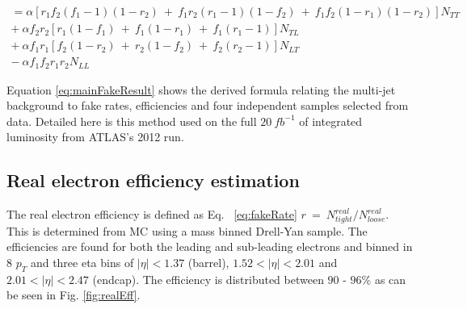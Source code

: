 \begin{equation} \label{eq:mainFakeResult}
\begin{aligned}
   =\alpha[r_{1}f_{2}(f_{1}-1)(1-r_{2})~+~f_{1}r_{2}(r_{1}-1)(1-f_{2})~+~f_{1}f_{2}(1-r_{1})(1-r_{2})]N_{TT} \\
   +~\alpha f_{2}r_{2}[r_{1}(1-f_{1})~+~f_{1}(1-r_{1})~+~f_{1}(r_{1}-1)]N_{TL} \\
   +~\alpha f_{1}r_{1}[f_{2}(1-r_{2})~+~r_{2}(1-f_{2})~+~f_{2}(r_{2}-1)]N_{LT} \\
   -~\alpha f_{1}f_{2}r_{1}r_{2}N_{LL}
\end{aligned}
\end{equation}

Equation \ref{eq:mainFakeResult} shows the derived formula relating the multi-jet background to fake rates, efficiencies and four independent samples selected from data. Detailed here is this method used on the full $20~fb^{-1}$ of integrated luminosity from ATLAS's 2012 run.


\subsection{Real electron efficiency estimation}

The real electron efficiency is defined as Eq. ~\ref{eq:fakeRate} $r~=~N^{real}_{tight}/N^{real}_{loose}$. This is determined from MC using a mass binned Drell-Yan sample. The efficiencies are found for both the leading and sub-leading electrons and binned in 8 $p_{T}$ and three eta bins of $|\eta|<1.37$ (barrel), $1.52<|\eta|<2.01$ and $2.01<|\eta|<2.47$ (endcap). The efficiency is distributed between $90$ - $96\%$ as can be seen in Fig. \ref{fig:realEff}.

